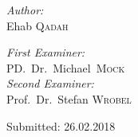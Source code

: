 \begin{titlepage}
\begin{center}
			\begin{minipage}[t]{0.4\textwidth}
				\begin{flushleft} \large
					\emph{Author:}\\
					Ehab \textsc{Qadah}
				\end{flushleft}
			\end{minipage}
			\begin{minipage}[t]{0.5\textwidth}
				\begin{flushright} \large
					\emph{First Examiner:} \\
					PD.~Dr.~Michael~\textsc{Mock} \\[0.5cm]
					\emph{Second Examiner:} \\
					Prof.~Dr.~Stefan \textsc{Wrobel} \\[0.5cm]
					
				\end{flushright}
			\end{minipage}
			
			\vfill
			
				{\large Submitted:\hspace{1cm} 26.02.2018}
			
		\end{center}
	\end{titlepage}